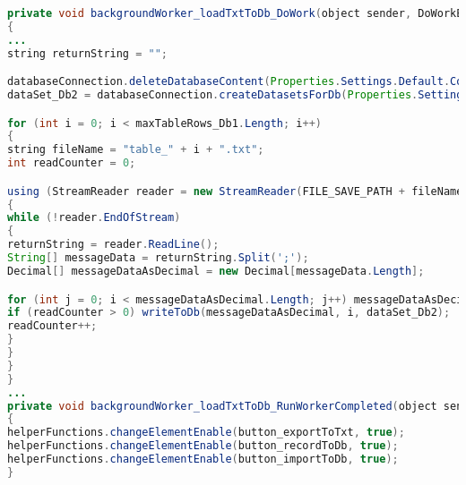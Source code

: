 \label{lst:importSteps}
\begin{lstlisting}[language=Java, caption=Schrittfolge importieren]
private void backgroundWorker_loadTxtToDb_DoWork(object sender, DoWorkEventArgs e)
{
...
string returnString = "";

databaseConnection.deleteDatabaseContent(Properties.Settings.Default.ConnectionString_DataBase_RightLeg_extracted);
dataSet_Db2 = databaseConnection.createDatasetsForDb(Properties.Settings.Default.ConnectionString_DataBase_RightLeg_extracted);

for (int i = 0; i < maxTableRows_Db1.Length; i++)
{
string fileName = "table_" + i + ".txt";
int readCounter = 0;

using (StreamReader reader = new StreamReader(FILE_SAVE_PATH + fileName))
{
while (!reader.EndOfStream)
{
returnString = reader.ReadLine();			
String[] messageData = returnString.Split(';');
Decimal[] messageDataAsDecimal = new Decimal[messageData.Length];

for (int j = 0; i < messageDataAsDecimal.Length; j++) messageDataAsDecimal[j] = Decimal.Parse(messageData[j], CultureInfo.InvariantCulture.NumberFormat);
if (readCounter > 0) writeToDb(messageDataAsDecimal, i, dataSet_Db2);
readCounter++;
}		
}
}
}
...
private void backgroundWorker_loadTxtToDb_RunWorkerCompleted(object sender, RunWorkerCompletedEventArgs e)
{
helperFunctions.changeElementEnable(button_exportToTxt, true);
helperFunctions.changeElementEnable(button_recordToDb, true);
helperFunctions.changeElementEnable(button_importToDb, true);
}
\end{lstlisting}